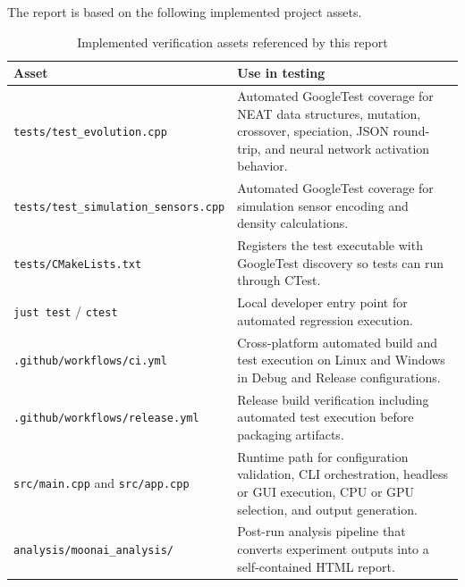 The report is based on the following implemented project assets.

\begin{table}[H]
	\centering
	\caption{Implemented verification assets referenced by this report}
	\label{tab:baseline-assets}
	\begin{tabularx}{\textwidth}{@{}>{\ttfamily\small}lX@{}}
		\toprule
		\textbf{Asset}                                                          & \textbf{Use in testing}                                                                                                                           \\
		\midrule
		\texttt{tests/test\_evolution.cpp}                                      & Automated GoogleTest coverage for NEAT data structures, mutation, crossover, speciation, JSON round-trip, and neural network activation behavior. \\
		\texttt{tests/test\_simulation\_sensors.cpp}                            & Automated GoogleTest coverage for simulation sensor encoding and density calculations.                                                            \\
		\texttt{tests/CMakeLists.txt}                                           & Registers the test executable with GoogleTest discovery so tests can run through CTest.                                                           \\
		\texttt{just test} / \texttt{ctest}                                     & Local developer entry point for automated regression execution.                                                                                   \\
		\texttt{.github/workflows/ci.yml}                                       & Cross-platform automated build and test execution on Linux and Windows in Debug and Release configurations.                                       \\
		\texttt{.github/workflows/release.yml}                                  & Release build verification including automated test execution before packaging artifacts.                                                         \\
		\texttt{src/main.cpp} and \texttt{src/app.cpp}                          & Runtime path for configuration validation, CLI orchestration, headless or GUI execution, CPU or GPU selection, and output generation.             \\
		\texttt{analysis/moonai\_analysis/}                                     & Post-run analysis pipeline that converts experiment outputs into a self-contained HTML report.                                                    \\

\end{tabularx}
\end{table}
